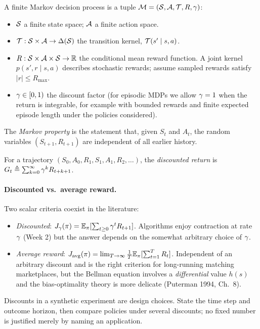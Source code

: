 \documentclass[11pt,oneside]{scrbook}
\begin{document}
\begin{definition}
A finite Markov decision process is a tuple
$\mathcal{M}=(\mathcal{S},\mathcal{A},\mathcal{T},R,\gamma)$:
\begin{itemize}\setlength\itemsep{1pt}
  \item $\mathcal{S}$ a finite state space; $\mathcal{A}$ a finite action space.
  \item $\mathcal{T}: \mathcal{S}\times\mathcal{A} \to \Delta(\mathcal{S})$ the transition kernel,
        $\mathcal{T}(s'\mid s,a)$.
  \item $R: \mathcal{S}\times\mathcal{A}\times\mathcal{S} \to \mathbb{R}$ the conditional
        mean reward function. A joint kernel $p(s',r\mid s,a)$ describes
        stochastic rewards; assume sampled rewards satisfy $|r|\le R_{\max}$.
  \item $\gamma\in[0,1)$ the discount factor (for episodic MDPs we allow
        $\gamma=1$ when the return is integrable, for example with bounded
        rewards and finite expected episode length under the policies considered).
\end{itemize}
The \emph{Markov property} is the statement that, given $S_t$ and $A_t$, the
random variables $(S_{t+1}, R_{t+1})$ are independent of all earlier history.
\end{definition}

\begin{definition}[Return]
For a trajectory $(S_0,A_0,R_1,S_1,A_1,R_2,\dots)$, the \emph{discounted return}
is $G_t \triangleq \sum_{k=0}^{\infty} \gamma^k R_{t+k+1}$.
\end{definition}

\paragraph{Discounted vs.\ average reward.} Two scalar criteria coexist in the
literature:
\begin{itemize}\setlength\itemsep{1pt}
  \item \emph{Discounted}: $J_\gamma(\pi)=\mathbb{E}_\pi[\sum_{t\ge 0}\gamma^t R_{t+1}]$. Algorithms enjoy
        contraction at rate $\gamma$ (Week 2) but the answer depends on the
        somewhat arbitrary choice of $\gamma$.
  \item \emph{Average reward}: $J_{\mathrm{avg}}(\pi)=\lim_{T\to\infty}\tfrac{1}{T}\mathbb{E}_\pi[\sum_{t=1}^T R_t]$.
        Independent of an arbitrary discount and is the right criterion for
        long-running matching marketplaces, but the Bellman equation involves a
        \emph{differential} value $h(s)$ and the bias-optimality theory is more
        delicate (Puterman 1994, Ch.\ 8).
\end{itemize}
Discounts in a synthetic experiment are design choices. State the time step
and outcome horizon, then compare policies under several discounts; no fixed
number is justified merely by naming an application.
\end{document}
